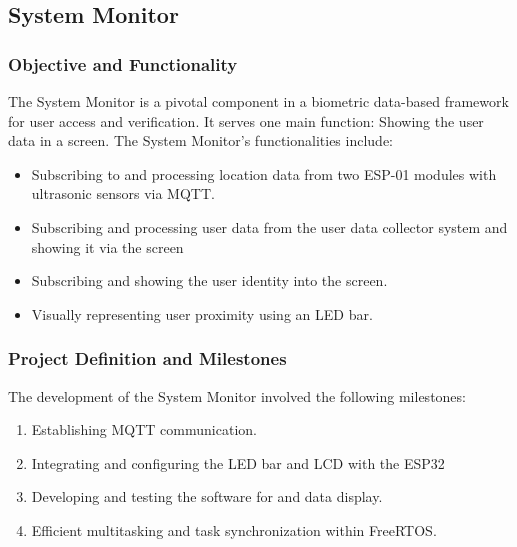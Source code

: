 \subsection{System Monitor}

\subsubsection{Objective and Functionality}
The System Monitor is a pivotal component in a biometric data-based framework for user access and verification. It serves one main function: Showing the user data in a screen. The System Monitor's functionalities include:
\begin{itemize}
    \item Subscribing to and processing location data from two ESP-01 modules with ultrasonic sensors via MQTT.
    \item Subscribing and processing user data from the user data collector system and showing it via the screen
    \item Subscribing and showing the user identity into the screen.
    \item Visually representing user proximity using an LED bar.
\end{itemize}

\subsubsection{Project Definition and Milestones}
The development of the System Monitor involved the following milestones:
\begin{enumerate}
    \item Establishing MQTT communication.
    \item Integrating and configuring the LED bar and LCD with the ESP32
    \item Developing and testing the software for and data display.
    \item Efficient multitasking and task synchronization within FreeRTOS.
\end{enumerate}

